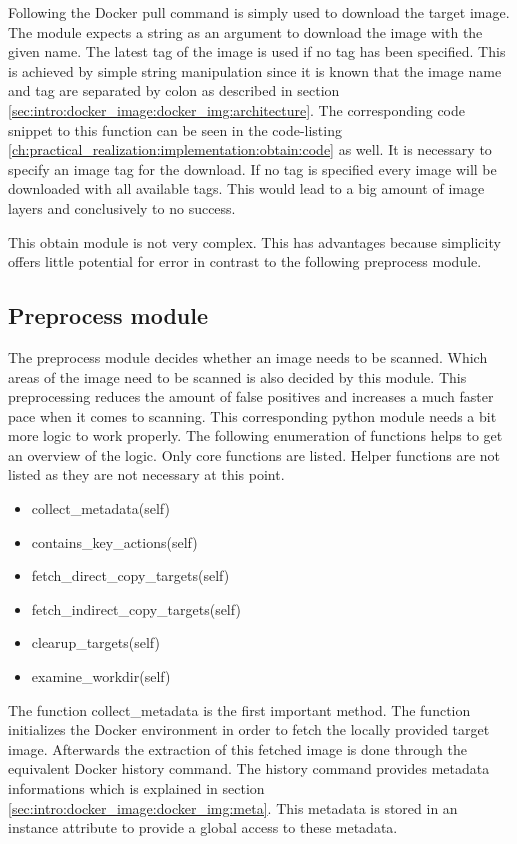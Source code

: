 Following the Docker pull command is simply used to download the target image. 
The module expects a string as an argument to download the image with the given name.
The latest tag of the image is used if no tag has been specified. 
This is achieved by simple string manipulation since it is known that the image name and tag are separated by colon as described in section \ref{sec:intro:docker_image:docker_img:architecture}.
The corresponding code snippet to this function can be seen in the code-listing \ref{ch:practical_realization:implementation:obtain:code} as well.
It is necessary to specify an image tag for the download.
If no tag is specified every image will be downloaded with all available tags.
This would lead to a big amount of image layers and conclusively to no success.

This obtain module is not very complex. 
This has advantages because simplicity offers little potential for error in contrast to the following preprocess module.

\subsection{Preprocess module}
\label{ch:practical_realization:implementation:preprocessing}
The preprocess module decides whether an image needs to be scanned. Which areas of the image need to be scanned is also decided by this module.
This preprocessing reduces the amount of false positives and increases a much faster pace when it comes to scanning.	
This corresponding python module needs a bit more logic to work properly. 
The following enumeration of functions helps to get an overview of the logic. 
Only core functions are listed.
Helper functions are not listed as they are not necessary at this point.
\begin{itemize}
\item collect\_metadata(self)
\item contains\_key\_actions(self)
\item fetch\_direct\_copy\_targets(self)
\item fetch\_indirect\_copy\_targets(self)
\item clearup\_targets(self)
\item examine\_workdir(self)
\end{itemize}
The function collect\_metadata is the first important method. 
The function initializes the Docker environment in order to fetch the locally provided target image. 
Afterwards the extraction of this fetched image is done through the equivalent Docker history command. 
The history command provides metadata informations which is explained in section \ref{sec:intro:docker_image:docker_img:meta}. 
This metadata is stored in an instance attribute to provide a global access to these metadata.

